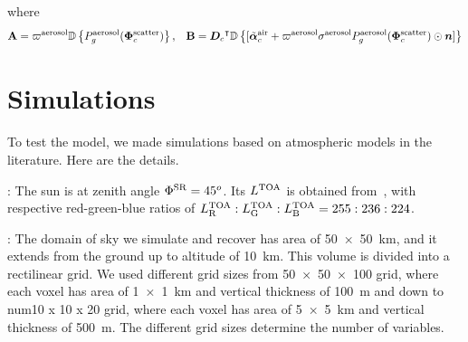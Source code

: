 \documentclass[10pt,letterpaper]{article}
\newcommand{\OpDiag}[1]{\mathbb{D}\left\{#1\right\}}
\newcommand{\abbrev}[1]{\rm{#1}}
\newcommand{\vect}[1]{\bm{#1}}
\newcommand{\transpose}[1]{{#1}^\intercal}
\begin{document}
where
\begin{equation}
  \label{eq:gradient3}
  {\bf A} = \varpi^{\rm aerosol}
       \OpDiag{ P_g^{\rm aerosol}(\vect{\Phi}^{\rm scatter}_c)}
  ,\;\;\;
  {\bf B} = \transpose{{\bm D}_c}
      \OpDiag{[\tilde{\vect{\alpha}}^{\rm air}_c + \varpi^{\rm
      aerosol}\sigma^{\rm aerosol} P^{\rm aerosol}_g(\vect{\Phi}^{\rm
      scatter}_c) \odot{\bm n}    ]}
\end{equation}




\section{Simulations}
\label{sec:simul}

To test the model, we made simulations based on atmospheric models in
the literature. Here are the details.

: The sun is at zenith angle $\Phi^{\rm
  SR}=45^o$. Its $L^{\rm TOA}$ is obtained
from~\cite{BBradiance,sun_composition}, with respective red-green-blue
ratios of $L^{\rm TOA}_{\rm R}:L^{\rm TOA}_{\rm G}:L^{\rm TOA}_{\rm
  B}=255:236:224$.

: The domain of sky we simulate and recover
has area of \SI{50 x 50}{\km}, and it extends from the ground up to
altitude of \SI{10}{\km}. This volume is divided into a rectilinear
grid. We used different grid sizes from \num{50 x 50 x 100} grid,
where each voxel has area of \SI{1 x 1}{\km} and vertical thickness of
\SI{100}{\metre} and down to num{10 x 10 x 20} grid, where each voxel
has area of \SI{5 x 5}{\km} and vertical thickness of
\SI{500}{\metre}. The different grid sizes determine the number of
variables.
\end{document}
